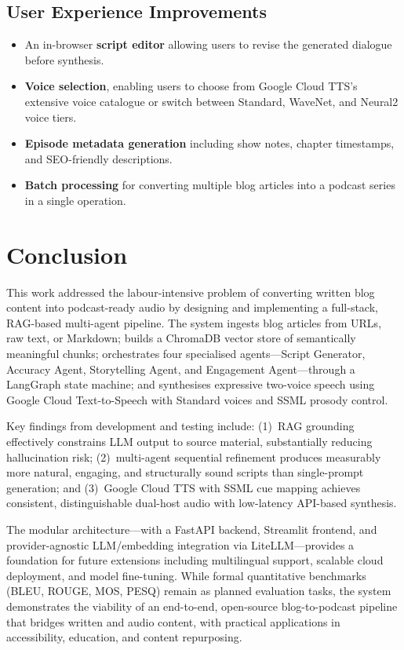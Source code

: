 \documentclass[sigconf,natbib=false]{acmart}   %
\begin{document}
\subsection{User Experience Improvements}
\begin{itemize}[nosep]
  \item An in-browser \textbf{script editor} allowing users to revise the generated dialogue before synthesis.
  \item \textbf{Voice selection}, enabling users to choose from Google Cloud TTS's extensive voice catalogue or switch between Standard, WaveNet, and Neural2 voice tiers.
  \item \textbf{Episode metadata generation} including show notes, chapter timestamps, and SEO-friendly descriptions.
  \item \textbf{Batch processing} for converting multiple blog articles into a podcast series in a single operation.
\end{itemize}

\section{Conclusion}
\label{sec:conclusion}

This work addressed the labour-intensive problem of converting written blog content into podcast-ready audio by designing and implementing a full-stack, RAG-based multi-agent pipeline.  The system ingests blog articles from URLs, raw text, or Markdown; builds a ChromaDB vector store of semantically meaningful chunks; orchestrates four specialised agents---Script Generator, Accuracy Agent, Storytelling Agent, and Engagement Agent---through a LangGraph state machine; and synthesises expressive two-voice speech using Google Cloud Text-to-Speech with Standard voices and SSML prosody control.

Key findings from development and testing include: (1)~RAG grounding effectively constrains LLM output to source material, substantially reducing hallucination risk; (2)~multi-agent sequential refinement produces measurably more natural, engaging, and structurally sound scripts than single-prompt generation; and (3)~Google Cloud TTS with SSML cue mapping achieves consistent, distinguishable dual-host audio with low-latency API-based synthesis.

The modular architecture---with a FastAPI backend, Streamlit frontend, and provider-agnostic LLM/embedding integration via LiteLLM---provides a foundation for future extensions including multilingual support, scalable cloud deployment, and model fine-tuning.  While formal quantitative benchmarks (BLEU, ROUGE, MOS, PESQ) remain as planned evaluation tasks, the system demonstrates the viability of an end-to-end, open-source blog-to-podcast pipeline that bridges written and audio content, with practical applications in accessibility, education, and content repurposing.

\printbibliography[heading=section]
\end{document}
